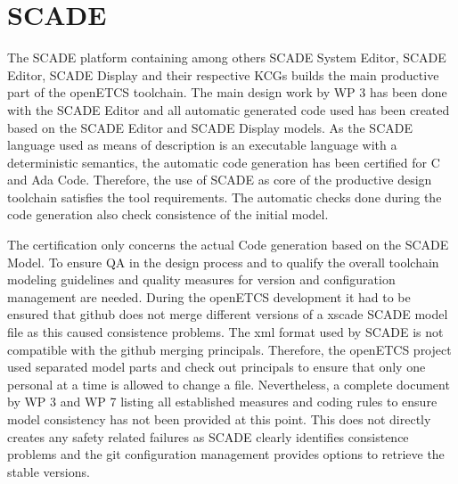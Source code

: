 \documentclass{template/openetcs_report}
\begin{document}
\section{SCADE}

The SCADE platform containing among others SCADE System Editor, SCADE Editor, SCADE Display and their respective KCGs builds the main productive part of the openETCS toolchain. The main design work by WP 3 has been done with the SCADE Editor and all automatic generated code used has been created based on the SCADE Editor and SCADE Display models. As the SCADE language used as means of description is  an executable language with a deterministic semantics, the automatic code generation has been certified for C and Ada Code. Therefore, the use of SCADE as core of the productive design toolchain satisfies the tool requirements. The automatic checks done during the code generation also check consistence of the initial model.

The certification only concerns the actual Code generation based on the SCADE Model. To ensure QA in the design process and to qualify the overall toolchain modeling guidelines and quality measures for version and configuration management are needed. During the openETCS development it had to be ensured that github does not merge different versions of a xscade SCADE model file as this caused consistence problems. The xml format used by SCADE is not compatible with the github merging principals. Therefore, the openETCS project used separated model parts and check out principals to ensure that only one personal at a time is allowed to change a file. Nevertheless, a complete document by WP 3 and WP 7 listing all established measures and coding rules to ensure model consistency has not been provided at this point. This does not directly creates any safety related failures as SCADE clearly identifies consistence problems and the git configuration management provides options to retrieve the stable versions.




\end{document}
